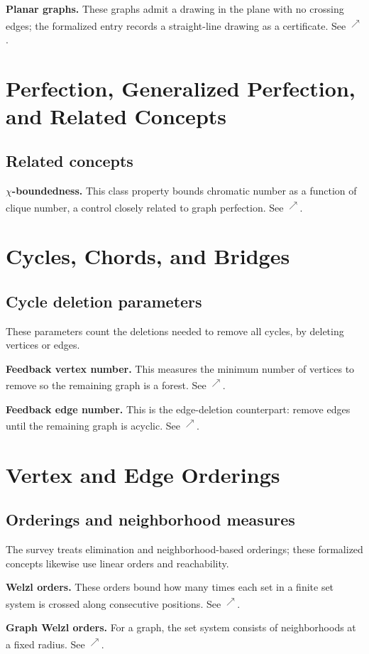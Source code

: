 \documentclass[11pt]{article}
\newcommand{\source}[2]{\textsuperscript{\href{https://laxarchive.org/#1/#2.html}{$\nearrow$}}}
\newcommand{\surveychapter}[2]{\setcounter{section}{#1}\section{#2}}
\begin{document}
\textbf{Planar graphs.}
These graphs admit a drawing in the plane with no
crossing edges; the formalized entry records a straight-line drawing as a
certificate. See \source{lax-68}{Lax68.Planar}.
\surveychapter{1}{Perfection, Generalized Perfection, and Related Concepts}

\subsection{Related concepts}

\textbf{$\chi$-boundedness.}
This class property bounds chromatic number as
a function of clique number, a control closely related to graph perfection.
See \source{lax-9}{Lax9.ChiBoundedness}.
\surveychapter{2}{Cycles, Chords, and Bridges}

\subsection{Cycle deletion parameters}

These parameters count the deletions needed to remove all cycles, by deleting
vertices or edges.

\textbf{Feedback vertex number.}
This measures the minimum number of vertices
to remove so the remaining graph is a forest. See
\source{lax-379983}{Lax379983.FeedbackVertexNumber}.

\textbf{Feedback edge number.}
This is the edge-deletion counterpart: remove
edges until the remaining graph is acyclic. See
\source{lax-379983}{Lax379983.FeedbackEdgeNumber}.
\surveychapter{4}{Vertex and Edge Orderings}

\subsection{Orderings and neighborhood measures}

The survey treats elimination and neighborhood-based orderings; these
formalized concepts likewise use linear orders and reachability.

\textbf{Welzl orders.}
These orders bound how many times each set in a finite
set system is crossed along consecutive positions. See
\source{lax-195003}{Lax195003.WelzlOrders}.

\textbf{Graph Welzl orders.}
For a graph, the set system consists of
neighborhoods at a fixed radius. See
\source{lax-195003}{Lax195003.WelzlOrdersInGraphs}.
\end{document}
